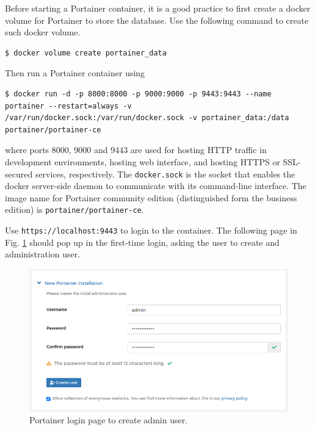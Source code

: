 Before starting a Portainer container, it is a good practice to first create a docker volume for Portainer to store the database. Use the following command to create such docker volume.
\begin{lstlisting}
$ docker volume create portainer_data
\end{lstlisting}
Then run a Portainer container using
\begin{lstlisting}
$ docker run -d -p 8000:8000 -p 9000:9000 -p 9443:9443 --name portainer --restart=always -v /var/run/docker.sock:/var/run/docker.sock -v portainer_data:/data portainer/portainer-ce
\end{lstlisting}
where ports 8000, 9000 and 9443 are used for hosting HTTP traffic in development environments, hosting web interface, and hosting HTTPS or SSL-secured services, respectively. The \verb|docker.sock| is the socket that enables the docker server-side daemon to communicate with its command-line interface. The image name for Portainer community edition (distinguished form the business edition) is \verb|portainer/portainer-ce|.

Use \verb|https://localhost:9443| to login to the container. The following page in Fig. \ref{ch:vac:fig:portainerlogin} should pop up in the first-time login, asking the user to create and administration user.
\begin{figure}[htbp]
	\centering
	\includegraphics[width=350pt]{chapters/part-3/figures/portainerlogin.png}
	\caption{Portainer login page to create admin user.} \label{ch:vac:fig:portainerlogin}
\end{figure}

